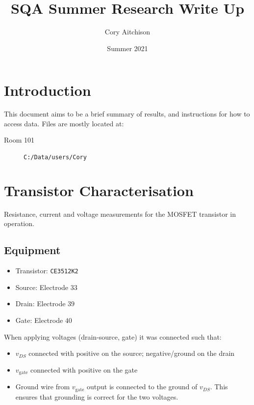\documentclass{article}
\title{SQA Summer Research Write Up}
\author{Cory Aitchison}
\date{Summer 2021}
\begin{document}
\maketitle

\begin{multicols*}{2}

    \section{Introduction}

    This document aims to be a brief summary of results, and instructions for how to access data. Files are mostly located at:

    \begin{description}
        \item[Room 101] \verb`C:/Data/users/Cory`
    \end{description}

    \section{Transistor Characterisation}

    Resistance, current and voltage measurements for the MOSFET transistor in operation.

    \subsection{Equipment}

    \begin{itemize}
        \item Transistor: \verb:CE3512K2:
        \item Source: Electrode $33$
        \item Drain: Electrode $39$
        \item Gate: Electrode $40$
    \end{itemize}

    \noindent When applying voltages (drain-source, gate) it was connected such that:

    \begin{itemize}
        \item $v_{DS}$ connected with positive on the source; negative/ground on the drain
        \item $v_\mathrm{gate}$ connected with positive on the gate
        \item Ground wire from $v_\mathrm{gate}$ output is connected to the ground of $v_{DS}$. This ensures that grounding is correct for the two voltages.
    \end{itemize}


\end{multicols*}
\end{document}
